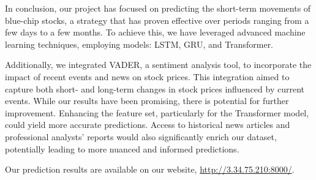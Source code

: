 In conclusion, our project has focused on predicting the short-term movements of blue-chip stocks, a strategy that has proven effective over periods ranging from a few days to a few months. 
To achieve this, we have leveraged advanced machine learning techniques, employing models: LSTM, GRU, and Transformer.

Additionally, we integrated VADER, a sentiment analysis tool, to incorporate the impact of recent events and news on stock prices. 
This integration aimed to capture both short- and long-term changes in stock prices influenced by current events. 
While our results have been promising, there is potential for further improvement. 
Enhancing the feature set, particularly for the Transformer model, could yield more accurate predictions. 
Access to historical news articles and professional analysts' reports would also significantly enrich our dataset, potentially leading to more nuanced and informed predictions.

Our prediction results are available on our website, \url{http://3.34.75.210:8000/}.